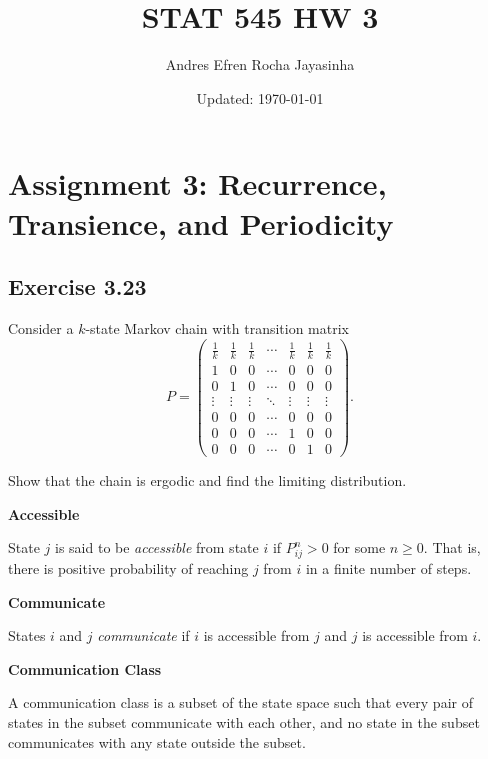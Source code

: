 \documentclass[hidelinks]{article}
\title{\textbf{STAT 545 HW 3}}
\author{Andres Efren Rocha Jayasinha}
\date{Updated: \today} %
\begin{document}
\hypersetup{bookmarksnumbered=true,}
\pagecolor{white}
\color{black}
\maketitle
\begin{Large}
\tableofcontents
\end{Large}%
\pagebreak

\section{Assignment 3: Recurrence, Transience, and Periodicity}

\subsection{Exercise 3.23}

Consider a $k$-state Markov chain with transition matrix
\[
P =
\begin{pmatrix}
\frac{1}{k} & \frac{1}{k} & \frac{1}{k} & \cdots & \frac{1}{k} & \frac{1}{k} & \frac{1}{k} \\
1 & 0 & 0 & \cdots & 0 & 0 & 0 \\
0 & 1 & 0 & \cdots & 0 & 0 & 0 \\
\vdots & \vdots & \vdots & \ddots & \vdots & \vdots & \vdots \\
0 & 0 & 0 & \cdots & 0 & 0 & 0 \\
0 & 0 & 0 & \cdots & 1 & 0 & 0 \\
0 & 0 & 0 & \cdots & 0 & 1 & 0
\end{pmatrix}.
\]


\noindent Show that the chain is ergodic and find the limiting distribution.

\smallskip

{\color{darkgreen}

\noindent \textbf{Accessible}

\noindent State $j$ is said to be \emph{accessible} from state $i$ if $P_{ij}^n > 0$ for some $n \ge 0$. 
That is, there is positive probability of reaching $j$ from $i$ in a finite number of steps.
}

{\noindent \color{darkgreen}

\noindent \textbf{Communicate}

\noindent States $i$ and $j$ \emph{communicate} if $i$ is accessible from $j$ and $j$ is accessible from $i$.
}

{\noindent \color{darkgreen}

\noindent \textbf{Communication Class}

\noindent A communication class is a subset of the state space such that every pair of states in the subset communicate with each other, and no state in the subset communicates with any state outside the subset.
}
\end{document}
